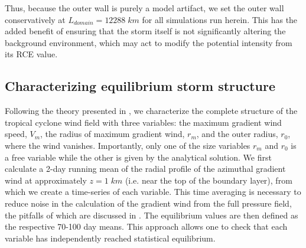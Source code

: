 \documentclass[12pt]{article}
\begin{document}
Thus, because the outer wall is purely a model artifact, we set the outer wall conservatively at $L_{domain} = 12288 \; km$ for all simulations run herein.  This has the added benefit of ensuring that the storm itself is not significantly altering the background environment, which may act to modify the potential intensity from its RCE value.

\subsection{Characterizing equilibrium storm structure}
Following the theory presented in \cite{Emanuel_Rotunno_2011}, we characterize the complete structure of the tropical cyclone wind field with three variables: the maximum gradient wind speed, $V_m$, the radius of maximum gradient wind, $r_m$, and the outer radius, $r_0$, where the wind vanishes. Importantly, only one of the size variables $r_m$ and $r_0$ is a free variable while the other is given by the analytical solution.  We first calculate a 2-day running mean of the radial profile of the azimuthal gradient wind at approximately $z = 1 \; km$ (i.e. near the top of the boundary layer), from which we create a time-series of each variable. This time averaging is necessary to reduce noise in the calculation of the gradient wind from the full pressure field, the pitfalls of which are discussed in \cite{Bryan_Rotunno_2009}. The equilibrium values are then defined as the respective 70-100 day means.  This approach allows one to check that each variable has independently reached statistical equilibrium.

\end{document}
